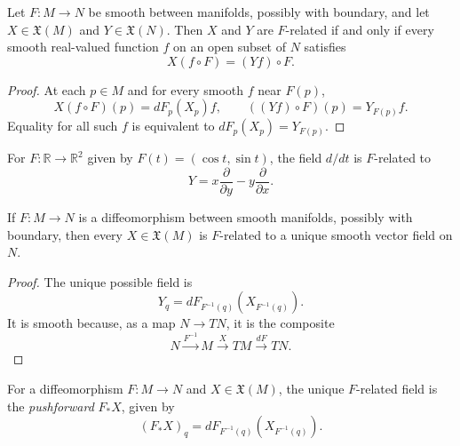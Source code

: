 \begin{proposition}
\label{prop:8-16}




Let $F\colon M\to N$ be smooth between manifolds, possibly with boundary, and
let $X\in\mathfrak{X}(M)$ and $Y\in\mathfrak{X}(N)$. Then $X$ and $Y$ are
$F$-related if and only if every smooth real-valued function $f$ on an open
subset of $N$ satisfies
\[
X(f\circ F)=(Yf)\circ F. \tag{8.6}
\]
\end{proposition}

\begin{proof}

\sketch At each $p\in M$ and for every smooth $f$ near $F(p)$,
\[
X(f\circ F)(p)=dF_p(X_p)f,
\qquad ((Yf)\circ F)(p)=Y_{F(p)}f.
\]
Equality for all such $f$ is equivalent to $dF_p(X_p)=Y_{F(p)}$.
\end{proof}

\begin{example}
\label{ex:8-17}




For $F\colon\mathbb{R}\to\mathbb{R}^2$ given by
$F(t)=(\cos t,\sin t)$, the field $d/dt$ is $F$-related to
\[
Y=x\frac{\partial}{\partial y}-y\frac{\partial}{\partial x}.
\]
\end{example}


\begin{proposition}
\label{prop:8-19}




If $F\colon M\to N$ is a diffeomorphism between smooth manifolds, possibly
with boundary, then every $X\in\mathfrak{X}(M)$ is $F$-related to a unique
smooth vector field on $N$.
\end{proposition}

\begin{proof}

\sketch The unique possible field is
\[
Y_q=dF_{F^{-1}(q)}(X_{F^{-1}(q)}).
\]
It is smooth because, as a map $N\to TN$, it is the composite
\[
N\xrightarrow{F^{-1}}M\xrightarrow{X}TM\xrightarrow{dF}TN.
\]
\end{proof}

\begin{definition}
\label{def:8-57-extra-2}




For a diffeomorphism $F\colon M\to N$ and $X\in\mathfrak{X}(M)$, the unique
$F$-related field is the \emph{pushforward} $F_*X$, given by
\[
(F_*X)_q=dF_{F^{-1}(q)}(X_{F^{-1}(q)}). \tag{8.7}
\]
\end{definition}

